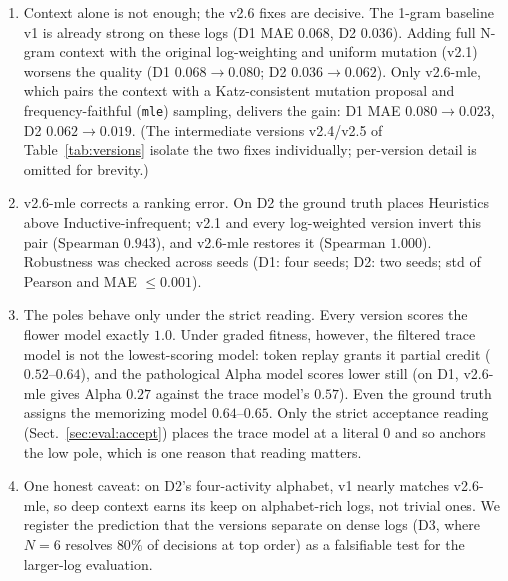 \documentclass[runningheads]{llncs}
\begin{document}
\begin{enumerate}
  \item Context alone is not enough; the v2.6 fixes are decisive. The 1-gram baseline v1 is already strong on these logs (D1 MAE $0.068$, D2 $0.036$). Adding full N-gram context with the original log-weighting and uniform mutation (v2.1) worsens the quality (D1 $0.068\to0.080$; D2 $0.036\to0.062$). Only v2.6-mle, which pairs the context with a Katz-consistent mutation proposal and frequency-faithful (\texttt{mle}) sampling, delivers the gain: D1 MAE $0.080\to0.023$, D2 $0.062\to0.019$. (The intermediate versions v2.4/v2.5 of Table~\ref{tab:versions} isolate the two fixes individually; per-version detail is omitted for brevity.)
  \item v2.6-mle corrects a ranking error. On D2 the ground truth places Heuristics above Inductive-infrequent; v2.1 and every log-weighted version invert this pair (Spearman $0.943$), and v2.6-mle restores it (Spearman $1.000$). Robustness was checked across seeds (D1: four seeds; D2: two seeds; std of Pearson and MAE $\le 0.001$).
  \item The poles behave only under the strict reading. Every version scores the flower model exactly $1.0$. Under graded fitness, however, the filtered trace model is not the lowest-scoring model: token replay grants it partial credit ($0.52$--$0.64$), and the pathological Alpha model scores lower still (on D1, v2.6-mle gives Alpha $0.27$ against the trace model's $0.57$). Even the ground truth assigns the memorizing model $0.64$--$0.65$. Only the strict acceptance reading (Sect.~\ref{sec:eval:accept}) places the trace model at a literal $0$ and so anchors the low pole, which is one reason that reading matters.
  \item One honest caveat: on D2's four-activity alphabet, v1 nearly matches v2.6-mle, so deep context earns its keep on alphabet-rich logs, not trivial ones. We register the prediction that the versions separate on dense logs (D3, where $N{=}6$ resolves $80\%$ of decisions at top order) as a falsifiable test for the larger-log evaluation.
\end{enumerate}
\end{document}
